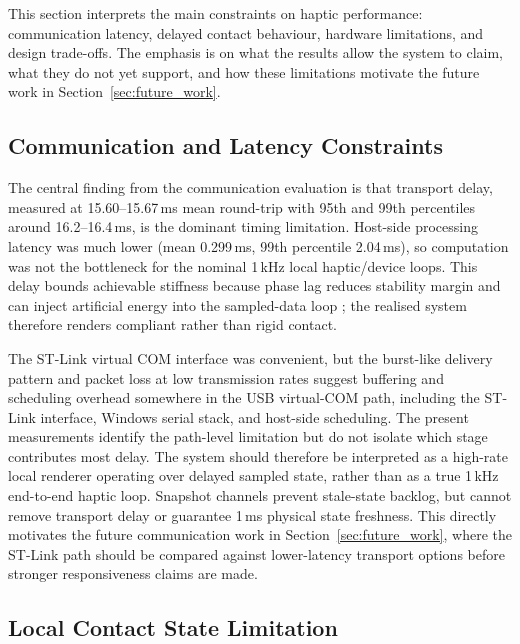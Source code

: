 This section interprets the main constraints on haptic performance: communication latency, delayed contact behaviour, hardware limitations, and design trade-offs. The emphasis is on what the results allow the system to claim, what they do not yet support, and how these limitations motivate the future work in Section~\ref{sec:future_work}.

\subsection{Communication and Latency Constraints} \label{sec:discussion_communication_latency}

The central finding from the communication evaluation is that transport delay, measured at 15.60--15.67\,ms mean round-trip with 95th and 99th percentiles around 16.2--16.4\,ms, is the dominant timing limitation. Host-side processing latency was much lower (mean 0.299\,ms, 99th percentile 2.04\,ms), so computation was not the bottleneck for the nominal 1\,kHz local haptic/device loops. This delay bounds achievable stiffness because phase lag reduces stability margin and can inject artificial energy into the sampled-data loop \cite{colgatePassivityClassSampleddata1997}; the realised system therefore renders compliant rather than rigid contact.

The ST-Link virtual COM interface was convenient, but the burst-like delivery pattern and packet loss at low transmission rates suggest buffering and scheduling overhead somewhere in the USB virtual-COM path, including the ST-Link interface, Windows serial stack, and host-side scheduling. The present measurements identify the path-level limitation but do not isolate which stage contributes most delay. The system should therefore be interpreted as a high-rate local renderer operating over delayed sampled state, rather than as a true 1\,kHz end-to-end haptic loop. Snapshot channels prevent stale-state backlog, but cannot remove transport delay or guarantee 1\,ms physical state freshness. This directly motivates the future communication work in Section~\ref{sec:future_work}, where the ST-Link path should be compared against lower-latency transport options before stronger responsiveness claims are made.

\subsection{Local Contact State Limitation} \label{sec:discussion_local_contact_state}

